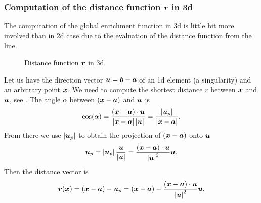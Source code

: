 \subsubsection{Computation of the distance function $\vc r$ in 3d}
The computation of the global enrichment function in 3d is little bit more involved than in 2d case
due to the evaluation of the distance function from the line.
%
\begin{figure}[!htb]
  \centering
  \def\svgwidth{0.5\textwidth}
  
  \caption{Distance function $\vc r$ in 3d.}
  \label{fig:distance_function_3d}
\end{figure}

Let us have the direction vector $\vc u = \vc b - \vc a$ of an 1d element (a singularity)
and an arbitrary point $\vc x$.
We need to compute the shortest distance $r$ between $\vc x$ and $\vc u$, see .
The angle $\alpha$ between $(\vc x - \vc a)$ and $\vc u$ is 
\[
\cos(\alpha) = \frac{(\vc x - \vc a)\cdot\vc u}{\abs{\vc x - \vc a}\abs{\vc u}} = \frac{\abs{\vc u_p}}{\abs{\vc x - \vc a}}.
\]
From there we use $\abs{\vc u_p}$ to obtain the projection of $(\vc x-\vc a)$ onto $\vc u$
\[
\vc u_p = \abs{\vc u_p}\frac{\vc u}{\abs{\vc u}} = \frac{(\vc x - \vc a)\cdot\vc u}{\abs{\vc u}^2} \vc u.
\]
Then the distance vector is
\[
  \vc r(\vc x) = (\vc x - \vc a) - \vc u_p = (\vc x - \vc a) - \frac{(\vc x - \vc a)\cdot\vc u}{\abs{\vc u}^2} \vc u.
\]
